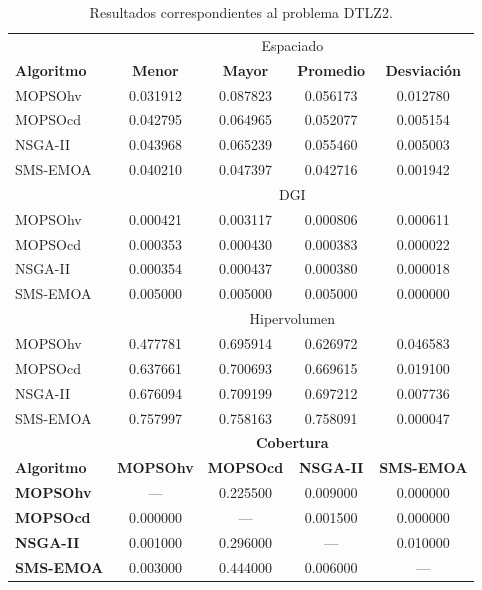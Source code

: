 \begin{table}
 \begin{center}
  \begin{tabular}{|l|cc|cc|} \hline
    & \multicolumn{4}{|c|}{Espaciado} \\ 
	\textbf{Algoritmo} & \textbf{Menor} & \textbf{Mayor} & \textbf{Promedio} & \textbf{Desviaci\'on} \\  \hline \hline
	MOPSOhv &0.031912 & 0.087823 & 0.056173 & 0.012780    \\ 
	MOPSOcd &0.042795 & 0.064965 & 0.052077 & 0.005154  \\ 
	NSGA-II &0.043968 & 0.065239 & 0.055460 & 0.005003   \\  
	SMS-EMOA &0.040210 & 0.047397 & 0.042716 & 0.001942   \\  
	\hline\hline
    & \multicolumn{4}{|c|}{DGI} \\ 
	\hline\hline
	MOPSOhv &0.000421 & 0.003117 & 0.000806 & 0.000611    \\ 
	MOPSOcd &0.000353 & 0.000430 & 0.000383 & 0.000022   \\ 
	NSGA-II &0.000354 & 0.000437 & 0.000380 & 0.000018   \\  
	SMS-EMOA &0.005000 & 0.005000 & 0.005000 & 0.000000   \\  
	\hline\hline
    & \multicolumn{4}{|c|}{Hipervolumen} \\ 
	\hline \hline
	MOPSOhv &0.477781 & 0.695914 & 0.626972 & 0.046583   \\ 
	MOPSOcd &0.637661 & 0.700693 & 0.669615 & 0.019100   \\ 
	NSGA-II &0.676094 & 0.709199 & 0.697212 & 0.007736   \\  
	SMS-EMOA &0.757997 & 0.758163 & 0.758091 & 0.000047   \\  
	\hline\hline
	& \multicolumn{4}{|c|}{\textbf{Cobertura}} \\ \hline\hline 
	\textbf{Algoritmo} & \textbf{MOPSOhv} & \textbf{MOPSOcd} & \textbf{NSGA-II} & \textbf{SMS-EMOA} \\  \hline \hline
	\textbf{MOPSOhv} & ---       & 0.225500  &  0.009000 & 0.000000 \\ 
	\textbf{MOPSOcd} &  0.000000 & ---       & 0.001500  & 0.000000  \\ 
	\textbf{NSGA-II} & 0.001000  &  0.296000 & ---       & 0.010000 \\  
	\textbf{SMS-EMOA}& 0.003000  & 0.444000  &  0.006000 & --- \\  
	\hline
	\end{tabular}
\caption{Resultados correspondientes al problema DTLZ2.}
  \label{tab:dtlz2}
\end{center}
\end{table}

